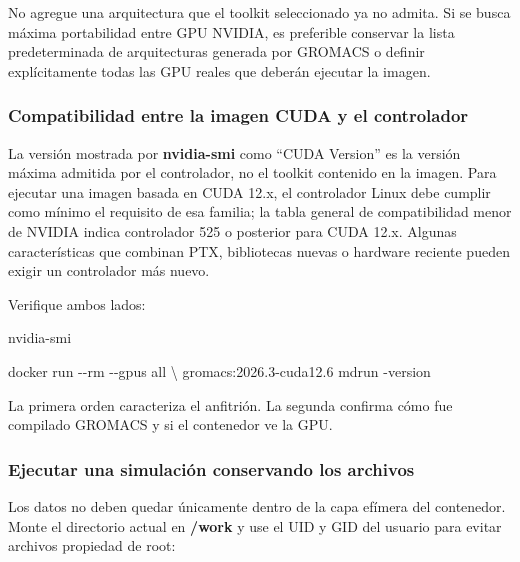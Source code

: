 \documentclass[
  spanish,
  11pt,
  a4paper]{article}
\newenvironment{Shaded}{\begin{snugshade}}{\end{snugshade}}
\newcommand{\AttributeTok}[1]{\textcolor[rgb]{0.13,0.29,0.53}{#1}}
\newcommand{\DataTypeTok}[1]{\textcolor[rgb]{0.13,0.29,0.53}{#1}}
\newcommand{\ExtensionTok}[1]{#1}
\newcommand{\NormalTok}[1]{#1}
\begin{document}
No agregue una arquitectura que el toolkit seleccionado ya no admita. Si
se busca máxima portabilidad entre GPU NVIDIA, es preferible conservar
la lista predeterminada de arquitecturas generada por GROMACS o definir
explícitamente todas las GPU reales que deberán ejecutar la imagen.

\subsubsection{Compatibilidad entre la imagen CUDA y el
controlador}\label{compatibilidad-entre-la-imagen-cuda-y-el-controlador}

La versión mostrada por \textbf{nvidia-smi} como ``CUDA Version'' es la
versión máxima admitida por el controlador, no el toolkit contenido en
la imagen. Para ejecutar una imagen basada en CUDA 12.x, el controlador
Linux debe cumplir como mínimo el requisito de esa familia; la tabla
general de compatibilidad menor de NVIDIA indica controlador 525 o
posterior para CUDA 12.x. Algunas características que combinan PTX,
bibliotecas nuevas o hardware reciente pueden exigir un controlador más
nuevo.

Verifique ambos lados:

\begin{Shaded}
\begin{Highlighting}[]
\ExtensionTok{nvidia{-}smi}

\ExtensionTok{docker}\NormalTok{ run }\AttributeTok{{-}{-}rm} \AttributeTok{{-}{-}gpus}\NormalTok{ all }\DataTypeTok{\textbackslash{}}
\NormalTok{  gromacs:2026.3{-}cuda12.6 mdrun }\AttributeTok{{-}version}
\end{Highlighting}
\end{Shaded}

La primera orden caracteriza el anfitrión. La segunda confirma cómo fue
compilado GROMACS y si el contenedor ve la GPU.

\subsubsection{Ejecutar una simulación conservando los
archivos}\label{ejecutar-una-simulaciuxf3n-conservando-los-archivos}

Los datos no deben quedar únicamente dentro de la capa efímera del
contenedor. Monte el directorio actual en \textbf{/work} y use el UID y
GID del usuario para evitar archivos propiedad de root:
\end{document}
